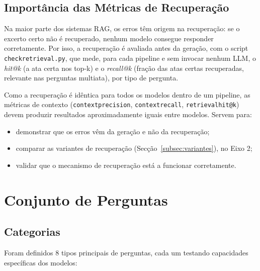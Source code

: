 \documentclass[11pt]{article}
\renewcommand{\_}{\textunderscore\allowbreak}
\begin{document}
\subsection{Importância das Métricas de Recuperação}

Na maior parte dos sistemas RAG, os erros têm origem na recuperação: se o excerto certo não é recuperado, nenhum modelo consegue responder corretamente. Por isso, a recuperação é avaliada antes da geração, com o script \texttt{check\_retrieval.py}, que mede, para cada pipeline e sem invocar nenhum LLM, o \textit{hit@k} (a ata certa nos top-k) e o \textit{recall@k} (fração das atas certas recuperadas, relevante nas perguntas multi\_ata), por tipo de pergunta.

Como a recuperação é idêntica para todos os modelos dentro de um pipeline, as métricas de contexto (\texttt{context\_precision}, \texttt{context\_recall}, \texttt{retrieval\_hit@k}) devem produzir resultados aproximadamente iguais entre modelos. Servem para:
\begin{itemize}
    \item demonstrar que os erros vêm da geração e não da recuperação;
    \item comparar as variantes de recuperação (Secção~\ref{subsec:variantes}), no Eixo 2;
    \item validar que o mecanismo de recuperação está a funcionar corretamente.
\end{itemize}

\section{Conjunto de Perguntas}
\label{sec:perguntas}

\subsection{Categorias}

Foram definidos 8 tipos principais de perguntas, cada um testando capacidades específicas dos modelos:
\end{document}
